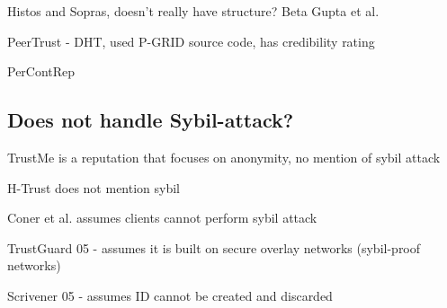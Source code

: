 Histos and Sopras\cite{zacharia2000collaborative}, doesn't really have structure?
Beta\cite{jsang2002beta}
Gupta et al.\cite{gupta2003reputation}

PeerTrust\cite{xiong2004peertrust} - DHT, used P-GRID source code, has credibility rating

PerContRep\cite{yan2014percontrep}


\subsection{Does not handle Sybil-attack?}
TrustMe\cite{singh2003trustme} is a reputation that focuses on anonymity, no mention of sybil attack

H-Trust\cite{zhao2009htrust} does not mention sybil

Coner et al.\cite{conner2009trust} assumes clients cannot perform sybil attack

TrustGuard 05\cite{srivatsa2005trustguard} - assumes it is built on secure overlay networks (sybil-proof networks)

Scrivener 05\cite{nandi2005scrivener} - assumes ID cannot be created and discarded

